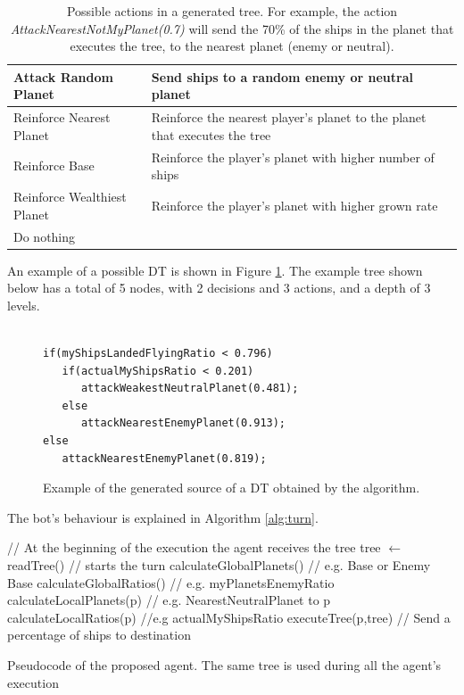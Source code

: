 \documentclass[preprint]{elsarticle}
\begin{document}
\begin{table}
{\begin{tabular}{|p{5cm}|p{8cm}|}
 Attack Random Planet & Send ships to a random enemy or neutral planet\\ \hline
Reinforce Nearest Planet & Reinforce the nearest player's planet to the planet that executes the tree \\ \hline
Reinforce Base & Reinforce the player's planet with higher number of ships \\ \hline
Reinforce Wealthiest Planet & Reinforce the player's planet with higher grown rate \\ \hline
Do nothing & \\ \hline
\end{tabular}
}
\caption{Possible actions in a generated tree. For example, the action \textit{AttackNearestNotMyPlanet(0.7)} will send the 70\% of the ships in the planet that executes the tree, to the nearest planet (enemy or neutral).}
\label{tab:actions}
\end{table}



\noindent An example of a possible DT is shown in Figure \ref{fig:sourcecode}. The example tree
shown below has a total of 5 nodes, with 2 decisions and 3 actions, and a
depth of 3 levels. 

\begin{figure}

\begin{Verbatim}[frame=single]

if(myShipsLandedFlyingRatio < 0.796)
   if(actualMyShipsRatio < 0.201)
      attackWeakestNeutralPlanet(0.481);
   else
      attackNearestEnemyPlanet(0.913);
else
   attackNearestEnemyPlanet(0.819);

\end{Verbatim}

\caption{Example of the generated source of a DT obtained by the algorithm.}
\label{fig:sourcecode}
\end{figure}

\noindent The bot's behaviour is explained in Algorithm \ref{alg:turn}.

\begin{algorithm}[ht]
\begin{algorithmic}

\STATE // At the beginning of the execution the agent receives the tree
\STATE tree $\leftarrow$ readTree()
	\STATE // starts the turn
	\STATE calculateGlobalPlanets() // e.g. Base or Enemy Base
	\STATE calculateGlobalRatios() // e.g. myPlanetsEnemyRatio
		\STATE calculateLocalPlanets(p) // e.g. NearestNeutralPlanet to p
		\STATE calculateLocalRatios(p) //e.g actualMyShipsRatio
		\STATE executeTree(p,tree)  // Send a percentage of ships to destination
   \ENDFOR
\ENDWHILE

\end{algorithmic}
\caption{Pseudocode of the proposed agent. The same tree is used during all the agent's execution}
\label{alg:turn}
\end{algorithm}
\end{document}
